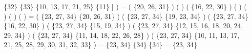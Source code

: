 \documentclass[a4paper,11pt]{article}
\begin{document}
\{32\} \cup \{33\} \cup \{10, 13, 17, 21, 25\} \cup \{11\} \Big] \Big) = \Big(  \cap \{20, 26, 31\} \Big) \cup \Big(  \cap {} \Big) \cup \Big(  \cap \{16, 22, 30\} \Big) \cup \Big(  \cap {} \Big) \cup \Big(  \cap {} \Big) \cup \Big(  \cap {} \Big) \cup \Big(  \cap {} \Big) = \Big( \{23, 27, 34\} \cap \{20, 26, 31\} \Big) \cup \Big( \{23, 27, 34\} \cap \{19, 23, 34\} \Big) \cup \Big( \{23, 27, 34\} \cap \{16, 22, 30\} \Big) \cup \Big( \{23, 27, 34\} \cap \{15, 19, 34\} \Big) \cup \Big( \{23, 27, 34\} \cap \{12, 15, 16, 18, 20, 24, 29, 34\} \Big) \cup \Big( \{23, 27, 34\} \cap \{11, 14, 18, 22, 26, 28\} \Big) \cup \Big( \{23, 27, 34\} \cap \{10, 11, 13, 17, 21, 25, 28, 29, 30, 31, 32, 33\} \Big) = \varnothing \cup \{23, 34\} \cup \varnothing \cup \{34\} \cup \{34\} \cup \varnothing \cup \varnothing = \{23, 34\}\\
\end{document}
